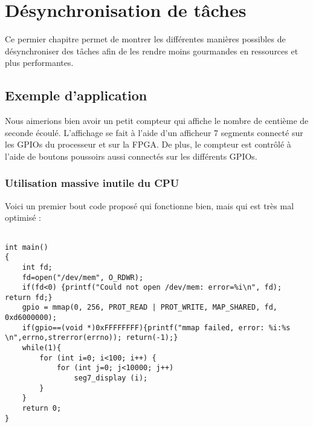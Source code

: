 
\chapter{Désynchronisation de tâches} %

\label{Chapitre 2} %


Ce permier chapitre permet de montrer les différentes manières possibles de désynchroniser des tâches afin de les rendre moins gourmandes en ressources et plus performantes. 

\section{Exemple d'application}

Nous aimerions bien avoir un petit compteur qui affiche le nombre de centième de seconde écoulé. L'affichage se fait à l'aide d'un afficheur 7 segments connecté sur les GPIOs du processeur et sur la FPGA. De plus, le compteur est contrôlé à l'aide de boutons poussoirs aussi connectés sur les différents GPIOs.
\subsection{Utilisation massive inutile du CPU}
Voici un premier bout code proposé qui fonctionne bien, mais qui est très mal optimisé :
\begin{lstlisting}[frame=single,style=C]  % Start your code-block

int main()
{
	int fd;
	fd=open("/dev/mem", O_RDWR);
	if(fd<0) {printf("Could not open /dev/mem: error=%i\n", fd); return fd;}
	gpio = mmap(0, 256, PROT_READ | PROT_WRITE, MAP_SHARED, fd, 0xd6000000);
	if(gpio==(void *)0xFFFFFFFF){printf("mmap failed, error: %i:%s \n",errno,strerror(errno)); return(-1);}
	while(1){
		for (int i=0; i<100; i++) {
			for (int j=0; j<10000; j++)
				seg7_display (i);
		}	
	}
	return 0;
}
\end{lstlisting}

